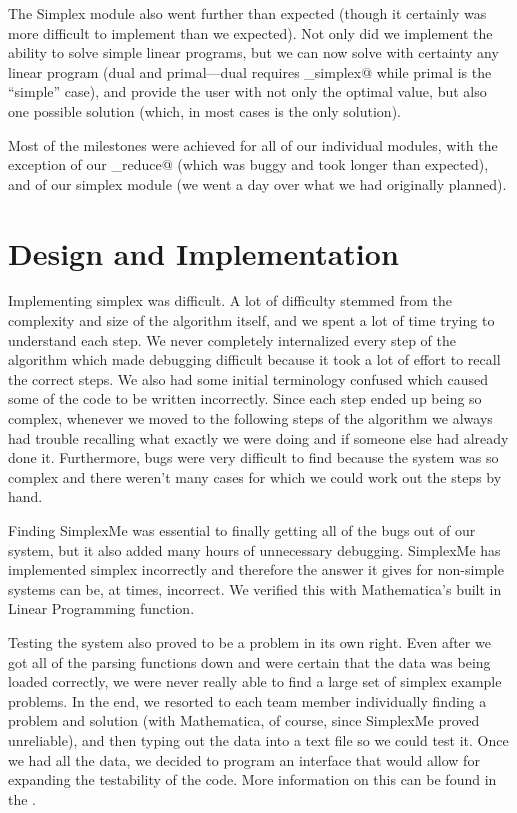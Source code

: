 \documentclass[letterpaper,12pt]{article}
\begin{document}
The Simplex module also went further than expected (though it certainly was more
difficult to implement than we expected). Not only did we implement the ability
to solve simple linear programs, but we can now solve with certainty any linear
program (dual and primal---dual requires \verb@initialize_simplex@ while primal
is the ``simple'' case), and provide the user with not only the optimal value,
but also one possible solution (which, in most cases is the only solution). 

Most of the milestones were achieved for all of our individual modules, with the
exception of our \verb@row_reduce@ (which was buggy and took longer than
expected), and of our simplex module (we went a day over what we had originally
planned). 

\section{Design and Implementation}

Implementing simplex was difficult. A lot of difficulty stemmed from the
complexity and size of the algorithm itself, and we spent a lot of time trying
to understand each step. We never completely internalized every step of the
algorithm which made debugging difficult because it took a lot of effort to
recall the correct steps. We also had some initial terminology confused which
caused some of the code to be written incorrectly. Since each step ended up
being so complex, whenever we moved to the following steps of the algorithm we
always had trouble recalling what exactly we were doing and if someone else had
already done it. Furthermore, bugs were very difficult to find because the
system was so complex and there weren't many cases for which we could work
out the steps by hand. 

Finding SimplexMe was essential to finally getting all of the bugs out of our
system, but it also added many hours of unnecessary debugging. SimplexMe has
implemented simplex incorrectly and therefore the answer it gives for non-simple
systems can be, at times, incorrect. We verified this with Mathematica's
built in Linear Programming function.

Testing the system also proved to be a problem in its own right. Even after we
got all of the parsing functions down and were certain that the data was being
loaded correctly, we were never really able to find a large set of simplex
example problems. In the end, we resorted to each team member individually
finding a problem and solution (with Mathematica, of course, since SimplexMe
proved unreliable), and then typing out the data into a text file so we could
test it. Once we had all the data, we decided to program an interface that would
allow for expanding the testability of the code. More information on this can be
found in the \verb@README@.
\end{document}
